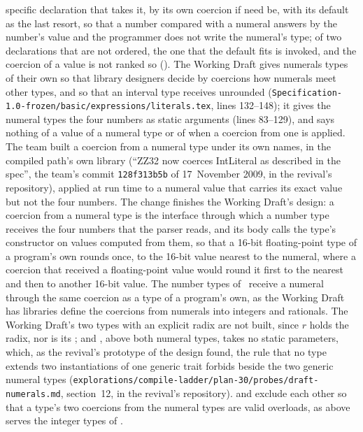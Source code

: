 \begin{description}
specific declaration that takes it, by its own coercion if need be, with its
default as the last resort, so that a number compared with a numeral answers by
the number's value and the programmer does not write the numeral's type; of two
declarations that are not ordered, the one that the default fits is invoked,
and the coercion of a value is not ranked so ().
The Working Draft gives numerals types of their own so that library designers
decide by coercions how numerals meet other types, and so that an interval type
receives  unrounded
(\nolinkurl{Specification-1.0-frozen/basic/expressions/literals.tex}, lines
132--148); it gives the numeral types the four numbers as static arguments
(lines 83--129), and says nothing of a value of a numeral type or of when a
coercion from one is applied.
The team built a coercion from a numeral type under its own names, in the
compiled path's own library (``ZZ32 now coerces IntLiteral as described in the
spec'', the team's commit \texttt{128f313b5b} of 17~November 2009, in the
revival's repository), applied at run time to a numeral value that carries its
exact value but not the four numbers.
The change finishes the Working Draft's design: a coercion from a numeral type
is the interface through which a number type receives the four numbers that the
parser reads, and its body calls the type's constructor on values computed from
them, so that a 16-bit floating-point type of a program's own rounds
 once, to the 16-bit value nearest to the numeral,
where a coercion that received a floating-point value would round it first to
the nearest  and then to another 16-bit value.
The number types of \library\ receive a numeral through the same coercion as a
type of a program's own, as the Working Draft has libraries define the coercions
from numerals into integers and rationals.
The Working Draft's two types with an explicit radix are not built, since $r$
holds the radix, nor is its ; and , above both numeral
types, takes no static parameters, which, as the revival's prototype of the
design found, the rule that no type extends two instantiations of one generic
trait forbids beside the two generic numeral types
(\nolinkurl{explorations/compile-ladder/plan-30/probes/draft-numerals.md},
section~12, in the revival's repository).
 and  exclude each other so
that a type's two coercions from the numeral types are valid overloads, as
 above  serves the integer types of \library.

\end{description}
